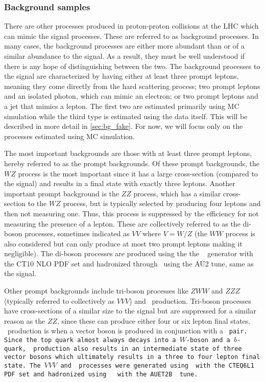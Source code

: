 \subsubsection{Background samples}
\label{sec:www_bg_samples}

There are other processes produced in proton-proton collisions at the LHC
which can mimic the signal processes. These are referred to as background processes.
In many cases, the background processes are either
more abundant than or of a similar abundance to
the signal. As a result, they must be well understood if there is any hope
of distinguishing between the two. The background processes to the signal
are characterized by having either at least three prompt leptons, meaning they
come directly from the hard scattering process;  
two prompt leptons and an isolated photon, which can mimic an electron;
or two prompt leptons and a jet that mimics a lepton.
The first two are estimated primarily using MC simulation while the third type
is estimated using the data itself. 
This will be described in more detail in \sec\ref{sec:bg_fake}.
For now, we will focus only on the processes estimated using MC simulation.

The most important backgrounds are those with at least three prompt leptons, 
hereby referred to as the prompt backgrounds. Of these prompt backgrounds,
the $WZ$ process is the most important since it has a 
large cross-section (compared to the signal)
and results in a final state with exactly three leptons. Another important 
prompt background is the $ZZ$ process,
which has a similar cross-section to the $WZ$ process, but is typically 
selected by producing
four leptons and then not measuring one. Thus, this process is suppressed by the 
efficiency for not measuring the presence of a lepton. 
These are collectively referred to as the di-boson processes, sometimes
indicated as $VV$ where $V=W/Z$ (the $WW$ process is also considered
but can only produce at most two prompt leptons making it negligible). 
The di-boson processes are produced using the 
the \powheg~\cite{Alioli:2008gx,Nason:2004rx,Frixione:2007vw,Alioli:2010xd} generator
with the CT10 NLO PDF set and 
hadronized through \pythiaeight~using the AU2 tune, same as the signal.

Other prompt backgrounds 
include tri-boson processes like $ZWW$ and $ZZZ$ 
(typically referred to collectively as $VVV$)
and \ttV~production. Tri-boson processes
have cross-sections of a similar size to the signal but are suppressed 
for a similar reason
as the $ZZ$, since these can produce either four or six lepton final 
states. 
\ttV~production is when a vector
boson is produced in conjunction with a \tt~pair. 
Since the top quark almost always decays
into a $W$-boson and a $b$-quark, \ttV~production also results in an intermediate
state of three vector bosons which ultimately results in a three to four lepton
final state.
The $VVV$ and \ttV~processes were generated using \madgraph~with the 
CTEQ6L1 PDF set and hadronized
using \pythiasix~\cite{PYTHIA} with the AUET2B~\cite{ATL-PHYS-PUB-2011-009} 
tune.


